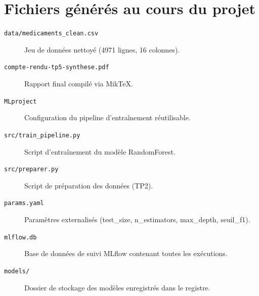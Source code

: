 \documentclass[12pt,a4paper]{report}
\begin{document}
\appendix
\chapter{Fichiers générés au cours du projet}
\begin{description}
    \item[\texttt{data/medicaments\_clean.csv}] Jeu de données nettoyé (4971 lignes, 16 colonnes).
    \item[\texttt{compte-rendu-tp5-synthese.pdf}] Rapport final compilé via MikTeX.
    \item[\texttt{MLproject}] Configuration du pipeline d'entraînement réutilisable.
    \item[\texttt{src/train\_pipeline.py}] Script d'entraînement du modèle RandomForest.
    \item[\texttt{src/preparer.py}] Script de préparation des données (TP2).
    \item[\texttt{params.yaml}] Paramètres externalisés (test\_size, n\_estimators, max\_depth, seuil\_f1).
    \item[\texttt{mlflow.db}] Base de données de suivi MLflow contenant toutes les exécutions.
    \item[\texttt{models/}] Dossier de stockage des modèles enregistrés dans le registre.
\end{description}
\end{document}
